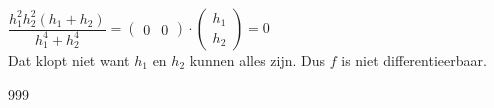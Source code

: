 \documentclass[a4paper]{article}
\begin{document}
$\dfrac{ h_1^2 h_2^2\left( h_1+ h_2\right)}{h_1^4+h_2^4} = 
\begin{pmatrix}0 & 0\end{pmatrix} \cdot \begin{pmatrix}h_1 \\ h_2\end{pmatrix} = 0$\\

Dat klopt niet want $h_1$ en $h_2$ kunnen alles zijn. Dus $f$ is niet differentieerbaar.\\


\begin{thebibliography}{999}
\end{thebibliography}
\end{document}
